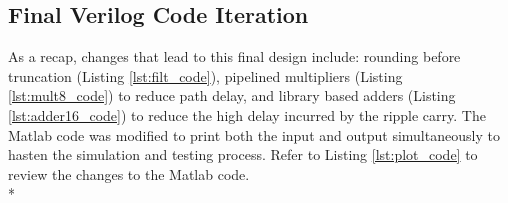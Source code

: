 \subsection*{Final Verilog Code Iteration}
As a recap, changes that lead to this final design include: rounding before truncation (Listing \ref{lst:filt_code}), pipelined multipliers (Listing \ref{lst:mult8_code}) to reduce path delay, and library based adders (Listing \ref{lst:adder16_code}) to reduce the high delay incurred by the ripple carry. The Matlab code was modified to print both the input and output simultaneously to hasten the simulation and testing process. Refer to Listing \ref{lst:plot_code} to review the changes to the Matlab code.
\\*
\lstset{language=verilog}






\lstset{language=matlab}

